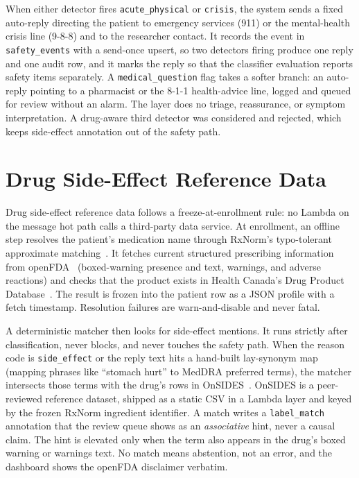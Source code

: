 When either detector fires \texttt{acute\_physical} or \texttt{crisis}, the
system sends a fixed auto-reply directing the patient to emergency services
(911) or the mental-health crisis line (9-8-8) and to the researcher contact.
It records the event in \texttt{safety\_events} with a send-once upsert, so two
detectors firing produce one reply and one audit row, and it marks the reply so
that the classifier evaluation reports safety items separately. A
\texttt{medical\_question} flag takes a softer branch: an auto-reply pointing
to a pharmacist or the 8-1-1 health-advice line, logged and queued for review
without an alarm. The layer does no triage, reassurance, or symptom
interpretation. A drug-aware third detector was considered and rejected, which
keeps side-effect annotation out of the safety path.

\section{Drug Side-Effect Reference Data}
\label{sec:arch-drug}

Drug side-effect reference data follows a freeze-at-enrollment rule: no Lambda
on the message hot path calls a third-party data service. At enrollment, an
offline step resolves the patient's medication name through RxNorm's
typo-tolerant approximate matching~\cite{rxnorm}. It fetches current
structured prescribing information from openFDA~\cite{openfda} (boxed-warning
presence and text, warnings, and adverse reactions) and checks that the product
exists in Health Canada's Drug Product Database~\cite{dpd}. The result is
frozen into the patient row as a JSON profile with a fetch timestamp.
Resolution failures are warn-and-disable and never fatal.

A deterministic matcher then looks for side-effect mentions. It runs strictly
after classification, never blocks, and never touches the safety path. When the
reason code is \texttt{side\_effect} or the reply text hits a hand-built
lay-synonym map (mapping phrases like ``stomach hurt'' to MedDRA preferred
terms), the matcher intersects those terms with the drug's rows in
OnSIDES~\cite{tanaka2025onsides}. OnSIDES is a peer-reviewed reference dataset,
shipped as a static CSV in a Lambda layer and keyed by the frozen RxNorm
ingredient identifier. A match writes a \texttt{label\_match} annotation that
the review queue shows as an \emph{associative} hint, never a causal claim. The
hint is elevated only when the term also appears in the drug's boxed warning or
warnings text. No match means abstention, not an error, and the dashboard shows
the openFDA disclaimer verbatim.

